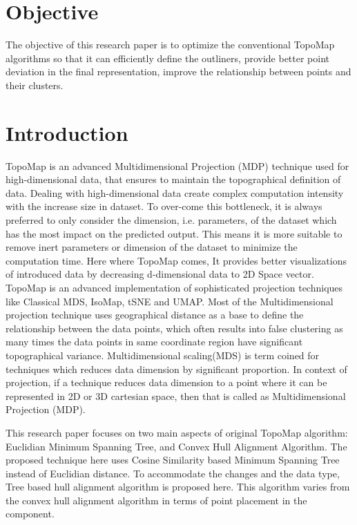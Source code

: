 \documentclass[11pt, a4paper]{article}
\begin{document}
\begin{multicols}{2}   
    \section{Objective}
    The objective of this research paper is to optimize the conventional TopoMap\cite{harishd} algorithms so that it can efficiently define the outliners, provide better point deviation in the final representation, improve the relationship between points and their clusters.
    \section{Introduction}
    TopoMap\cite{harishd} is an advanced Multidimensional Projection (MDP) technique used for high-dimensional data, that ensures to maintain the topographical definition of data. Dealing with high-dimensional data create complex computation intensity with the increase size in dataset. To over-come this bottleneck, it is always preferred to only consider the dimension, i.e. parameters, of the dataset which has the most impact on the predicted output. This means it is more suitable to remove inert parameters or dimension of the dataset to minimize the computation time. Here where TopoMap\cite{harishd} comes, It provides better visualizations of introduced data by decreasing d-dimensional data to 2D Space vector. TopoMap\cite{harishd} is an advanced implementation of sophisticated projection techniques like Classical MDS, IsoMap, tSNE and UMAP. Most of the Multidimensional projection technique uses geographical distance as a base to define the relationship between the data points, which often results into false clustering as many times the data points in same coordinate region have significant topographical variance. Multidimensional scaling(MDS) is term coined for techniques which reduces data dimension by significant proportion. In context of projection, if a technique reduces data dimension to a point where it can be represented in 2D or 3D cartesian space, then that is called as Multidimensional Projection (MDP).

    This research paper focuses on two main aspects of original TopoMap algorithm: Euclidian Minimum Spanning Tree, and Convex Hull Alignment Algorithm. The proposed technique here uses Cosine Similarity based Minimum Spanning Tree instead of Euclidian distance. To accommodate the changes and the data type, Tree based hull alignment algorithm is proposed here. This algorithm varies from the convex hull alignment algorithm in terms of point placement in the component.


\end{multicols}
\end{document}
